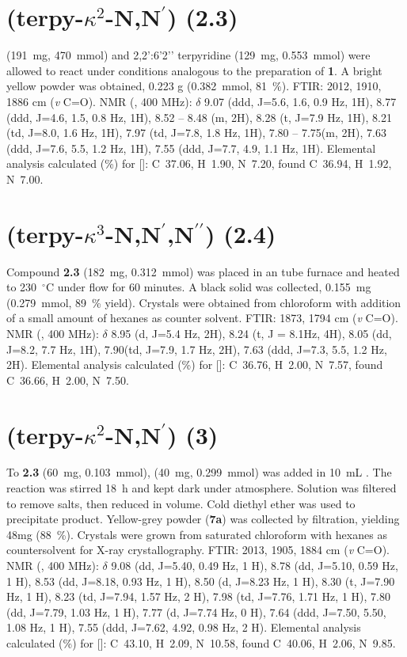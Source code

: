 \section{(terpy-$\kappa^2$-N,N$^\prime$) (2.3)}\label{sec.c3}
 (191~mg, 470~mmol) and 2,2’:6’2’’ terpyridine (129~mg, 0.553~mmol) were allowed to react under conditions analogous to the preparation of \textbf{1}. A bright yellow powder was obtained, 0.223 g (0.382~mmol, 81~\%). FTIR: 2012, 1910, 1886 cm (\textit{v} C=O).  NMR (, 400 MHz): $\delta$ 9.07 (ddd, J=5.6, 1.6, 0.9 Hz, 1H), 8.77 (ddd, J=4.6, 1.5, 0.8 Hz, 1H), 8.52 – 8.48 (m, 2H), 8.28 (t, J=7.9 Hz, 1H), 8.21 (td, J=8.0, 1.6 Hz, 1H), 7.97 (td, J=7.8, 1.8 Hz, 1H), 7.80 – 7.75(m, 2H), 7.63 (ddd, J=7.6, 5.5, 1.2 Hz, 1H), 7.55 (ddd, J=7.7, 4.9, 1.1 Hz, 1H). Elemental analysis calculated (\%) for []: C~37.06, H~1.90, N~7.20, found C~36.94, H~1.92, N~7.00.  

\section{(terpy-$\kappa^3$-N,N$^\prime$,N$^{\prime \prime}$) (2.4)}\label{sec.c4}
Compound \textbf{2.3} (182~mg, 0.312~mmol) was placed in an tube furnace and heated to 230~$^\circ$C under  flow for 60 minutes. A black solid was collected, 0.155~mg (0.279~mmol, 89~\% yield). Crystals were obtained from chloroform with addition of a small amount of hexanes as counter solvent. FTIR: 1873, 1794 cm (\textit{v} C=O).  NMR (, 400 MHz): $\delta$ 8.95 (d, J=5.4 Hz, 2H), 8.24 (t, J = 8.1Hz, 4H), 8.05 (dd, J=8.2, 7.7 Hz, 1H), 7.90(td, J=7.9, 1.7 Hz, 2H), 7.63 (ddd, J=7.3, 5.5, 1.2 Hz, 2H). Elemental analysis calculated (\%) for []: C~36.76, H~2.00, N~7.57, found C~36.66, H~2.00, N~7.50.

\section{(terpy-$\kappa^2$-N,N$^\prime$) (3)} \label{sec.c5}
To \textbf{2.3} (60~mg, 0.103~mmol),  (40~mg, 0.299~mmol) was added in 10~mL . The reaction was stirred 18~h and kept dark under  atmosphere. Solution was filtered to remove salts, then reduced in volume. Cold diethyl ether was used to precipitate product. Yellow-grey powder (\textbf{7a}) was collected by filtration, yielding 48mg (88~\%). Crystals were grown from saturated chloroform with hexanes as countersolvent for X-ray crystallography. FTIR: 2013, 1905, 1884 cm (\textit{v} C=O).  NMR (, 400 MHz): $\delta$ 9.08 (dd, J=5.40, 0.49 Hz, 1 H), 8.78 (dd, J=5.10, 0.59 Hz, 1 H), 8.53 (dd, J=8.18, 0.93 Hz, 1 H), 8.50 (d, J=8.23 Hz, 1 H), 8.30 (t, J=7.90 Hz, 1 H), 8.23 (td, J=7.94, 1.57 Hz, 2 H), 7.98 (td, J=7.76, 1.71 Hz, 1 H), 7.80 (dd, J=7.79, 1.03 Hz, 1 H), 7.77 (d, J=7.74 Hz, 0 H), 7.64 (ddd, J=7.50, 5.50, 1.08 Hz, 1 H), 7.55 (ddd, J=7.62, 4.92, 0.98 Hz, 2 H).  Elemental analysis calculated (\%) for []: C~43.10, H~2.09, N~10.58, found C~40.06, H~2.06, N~9.85.

